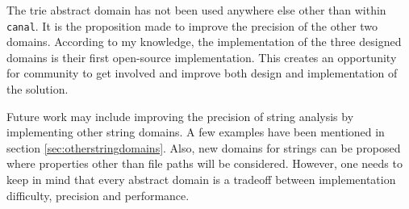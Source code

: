 \documentclass[12pt,final,oneside]{fithesis2}
\theoremstyle{definition}
\begin{document}
The trie abstract domain has not been used anywhere else other than
within \texttt{canal}. It is the proposition made to improve the precision of
the other two domains. According to my knowledge, the implementation of the
three designed domains is their first open-source implementation. This creates
an opportunity for community to get involved and improve both design and
implementation of the solution.

Future work may include improving the precision of string analysis by
implementing other string domains. A few examples have been mentioned
in section \ref{sec:otherstringdomains}. Also, new domains for strings can be
proposed where properties other than file paths will be considered. However,
one needs to keep in mind that every abstract domain is a tradeoff between
implementation difficulty, precision and performance.

\end{document}
